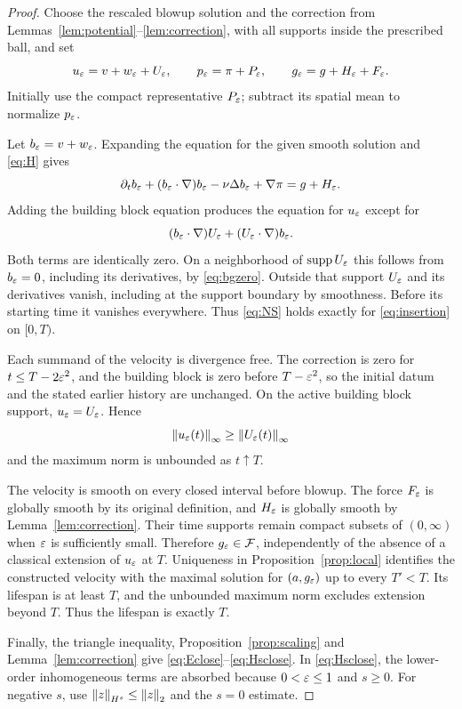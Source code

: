\begin{proof}
Choose the rescaled blowup solution and the correction from Lemmas~\ref{lem:potential}--\ref{lem:correction}, with all supports inside the prescribed ball, and set
\begin{equation}\label{eq:insertion}
 u_\varepsilon=v+w_\varepsilon+U_\varepsilon,\qquad
 p_\varepsilon=\pi+P_\varepsilon,\qquad
 g_\varepsilon=g+H_\varepsilon+F_\varepsilon.
\end{equation}
Initially use the compact representative $P_\varepsilon$; subtract its spatial mean to normalize $p_\varepsilon$.

Let $b_\varepsilon=v+w_\varepsilon$. Expanding the equation for the given smooth solution and \eqref{eq:H} gives
\[
 \partial_tb_\varepsilon+(b_\varepsilon\cdot\nabla)b_\varepsilon
 -\nu\Delta b_\varepsilon+\nabla\pi=g+H_\varepsilon.
\]
Adding the building block equation produces the equation for $u_\varepsilon$ except for
\[
 (b_\varepsilon\cdot\nabla)U_\varepsilon+(U_\varepsilon\cdot\nabla)b_\varepsilon.
\]
Both terms are identically zero. On a neighborhood of $\operatorname{supp} U_\varepsilon$ this follows from $b_\varepsilon=0$, including its derivatives, by \eqref{eq:bgzero}. Outside that support $U_\varepsilon$ and its derivatives vanish, including at the support boundary by smoothness. Before its starting time it vanishes everywhere. Thus \eqref{eq:NS} holds exactly for \eqref{eq:insertion} on $[0,T)$.

Each summand of the velocity is divergence free. The correction is zero for
$t\le T-2\varepsilon^2$, and the building block is zero before $T-\varepsilon^2$, so the initial datum and the stated earlier history are unchanged. On the active building block support, $u_\varepsilon=U_\varepsilon$. Hence
\[
 \left\lVert u_\varepsilon(t)\right\rVert_\infty\ge\left\lVert U_\varepsilon(t)\right\rVert_\infty
\]
and the maximum norm is unbounded as $t\uparrow T$.

The velocity is smooth on every closed interval before blowup. The force $F_\varepsilon$ is globally smooth by its original definition, and $H_\varepsilon$ is globally smooth by Lemma~\ref{lem:correction}. Their time supports remain compact subsets of $(0,\infty)$ when $\varepsilon$ is sufficiently small. Therefore $g_\varepsilon\in\mathcal F$, independently of the absence of a classical extension of $u_\varepsilon$ at $T$. Uniqueness in Proposition~\ref{prop:local} identifies the constructed velocity with the maximal solution for $(a,g_\varepsilon)$ up to every $T'<T$. Its lifespan is at least $T$, and the unbounded maximum norm excludes extension beyond $T$. Thus the lifespan is exactly $T$.

Finally, the triangle inequality, Proposition~\ref{prop:scaling} and
Lemma~\ref{lem:correction} give \eqref{eq:Eclose}--\eqref{eq:Hsclose}. In
\eqref{eq:Hsclose}, the lower-order inhomogeneous terms are absorbed because
$0<\varepsilon\le1$ and $s\ge0$. For negative $s$, use
$\left\lVert z\right\rVert_{H^s}\le\left\lVert z\right\rVert_2$ and the $s=0$ estimate.
\end{proof}

